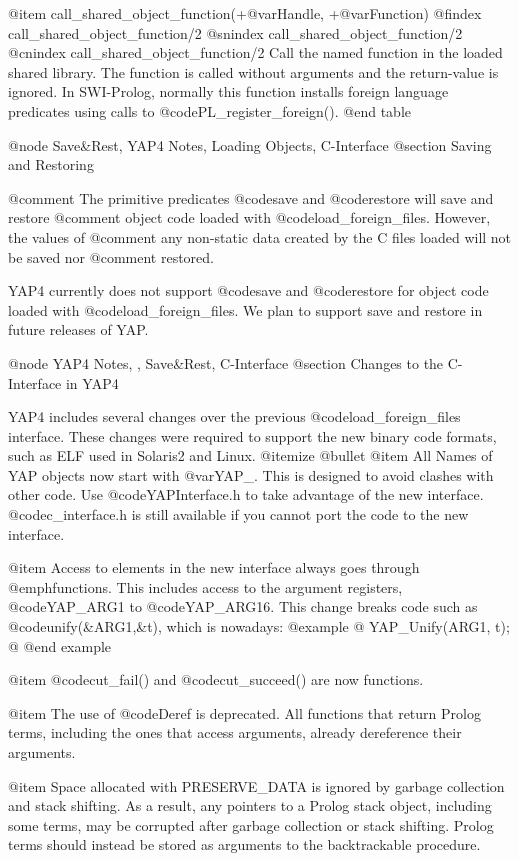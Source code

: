 {{{{{{{{@item call_shared_object_function(+@var{Handle}, +@var{Function})
@findex call_shared_object_function/2
@snindex call_shared_object_function/2
@cnindex call_shared_object_function/2
    Call the named function in the loaded shared library. The function
    is called without arguments and the return-value is
    ignored. In SWI-Prolog, normally this function installs foreign
    language predicates using calls to @code{PL_register_foreign()}.
@end table

@node Save&Rest, YAP4 Notes, Loading Objects, C-Interface
@section Saving and Restoring

@comment The primitive predicates @code{save} and @code{restore} will save and restore
@comment object code loaded with @code{load_foreign_files}. However, the values of
@comment any non-static data created by the C files loaded will not be saved nor
@comment restored.

YAP4 currently does not support @code{save} and @code{restore} for object code
loaded with @code{load_foreign_files}. We plan to support save and restore
in future releases of YAP.

@node YAP4 Notes, , Save&Rest, C-Interface
@section Changes to the C-Interface in YAP4

YAP4 includes several changes over the previous @code{load_foreign_files}
interface. These changes were required to support the new binary code
formats, such as ELF used in Solaris2 and Linux.
@itemize @bullet
@item All Names of YAP objects now start with @var{YAP_}. This is
designed to avoid clashes with other code. Use @code{YAPInterface.h} to
take advantage of the new interface. @code{c_interface.h} is still
available if you cannot port the code to the new interface.

@item Access to elements in the new interface always goes through
@emph{functions}. This includes access to the argument registers,
@code{YAP_ARG1} to @code{YAP_ARG16}. This change breaks code such as
@code{unify(&ARG1,&t)}, which is nowadays:
@example
@{
   YAP_Unify(ARG1, t);
@}
@end example

@item @code{cut_fail()} and @code{cut_succeed()} are now functions.

@item The use of @code{Deref} is deprecated. All functions that return
Prolog terms, including the ones that access arguments, already
dereference their arguments.

@item Space allocated with PRESERVE_DATA is ignored by garbage
collection and stack shifting. As a result, any pointers to a Prolog
stack object, including some terms, may be corrupted after garbage
collection or stack shifting. Prolog terms should instead be stored as
arguments to the backtrackable procedure.

}}}}}}}}
